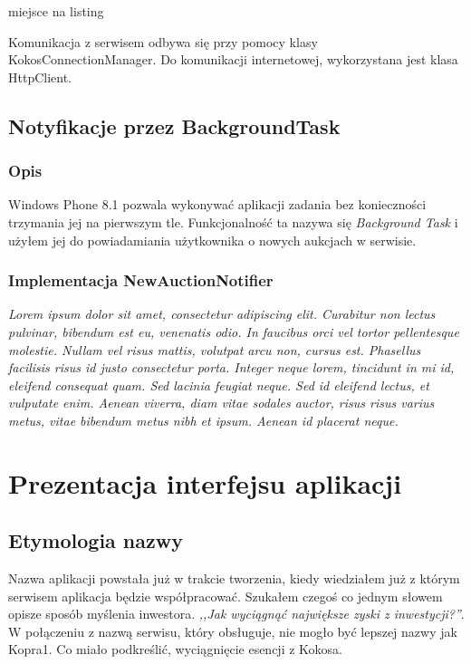 \documentclass[a4paper,twoside,titlepage,openright]{book}
\begin{document}
{\color{red} miejsce na listing}

Komunikacja z serwisem odbywa się przy pomocy klasy KokosConnectionManager. Do komunikacji internetowej, wykorzystana jest klasa HttpClient.


\section{Notyfikacje przez BackgroundTask}


\subsection{Opis}

Windows Phone 8.1 pozwala wykonywać aplikacji zadania bez konieczności trzymania jej na pierwszym tle. Funkcjonalność ta nazywa się \textit{Background Task} i użyłem jej do powiadamiania użytkownika o nowych aukcjach w serwisie.

\subsection{Implementacja NewAuctionNotifier}

{\color{red}\textit{Lorem ipsum dolor sit amet, consectetur adipiscing elit. Curabitur non lectus pulvinar, bibendum est eu, venenatis odio. In faucibus orci vel tortor pellentesque molestie. Nullam vel risus mattis, volutpat arcu non, cursus est. Phasellus facilisis risus id justo consectetur porta. Integer neque lorem, tincidunt in mi id, eleifend consequat quam. Sed lacinia feugiat neque. Sed id eleifend lectus, et vulputate enim. Aenean viverra, diam vitae sodales auctor, risus risus varius metus, vitae bibendum metus nibh et ipsum. Aenean id placerat neque. }}





\chapter{Prezentacja interfejsu aplikacji}

\section{Etymologia nazwy}

Nazwa aplikacji powstała już w trakcie tworzenia, kiedy wiedziałem już z którym serwisem aplikacja będzie współpracować. Szukałem czegoś co jednym słowem opisze sposób myślenia inwestora. \textit{,,Jak wyciągnąć największe zyski z inwestycji?''}. W połączeniu z nazwą serwisu, który obsługuje, nie mogło być lepszej nazwy jak Kopra1. Co miało podkreślić, wyciągnięcie esencji z Kokosa.
\end{document}
